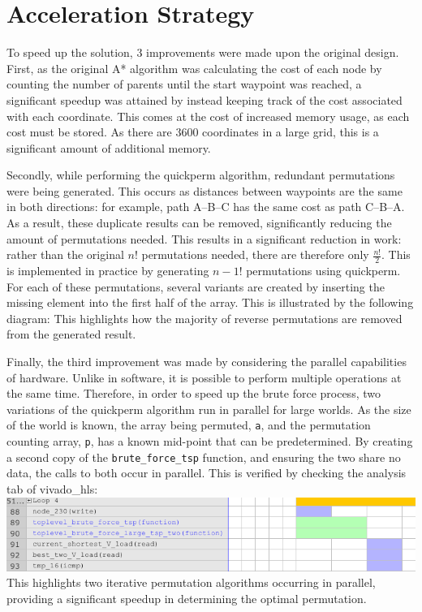 \documentclass[a4paper, 11pt]{article}
\begin{document}
\section{Acceleration Strategy} %
To speed up the solution, 3 improvements were made upon the original design. 
First, as the original A* algorithm was calculating the cost of each node by 
counting the number of parents until the start waypoint was reached, a significant 
speedup was attained by instead keeping track of the cost associated with each 
coordinate. This comes at the cost of increased memory usage, as each cost must 
be stored. As there are 3600 coordinates in a large grid, this is a significant 
amount of additional memory. 
\par\bigskip\noindent
Secondly, while performing the quickperm algorithm, redundant permutations were being 
generated. This occurs as distances between waypoints are the same in both directions: 
for example, path A--B--C has the same cost as path C--B--A. As a result, these 
duplicate results can be removed, significantly reducing the amount of permutations 
needed. This results in a significant reduction in work: rather than the original 
$n!$ permutations needed, there are therefore only
$\frac{n!}{2}$. 
This is implemented in practice by generating $n-1!$ permutations using
quickperm. For each of these permutations, several variants are created by 
inserting the missing element into the first half of the array. 
This is illustrated by the following diagram: 
This highlights how the majority of reverse permutations are removed from the
generated result. 
\par\bigskip\noindent
Finally, the third improvement was made by considering the parallel capabilities 
of hardware. Unlike in software, it is possible to perform multiple operations at 
the same time. Therefore, in order to speed up the brute force process, 
two variations of the quickperm algorithm run in parallel for large worlds. 
As the size of the world is known, the array being 
permuted, \texttt{a}, and the permutation counting array, \texttt{p}, has a known 
mid-point that can be predetermined. By creating a second copy of the 
\texttt{brute\_force\_tsp} function, and ensuring the two share no data, the calls 
to both occur in parallel. This is verified by checking the analysis tab of 
vivado\_hls:  \\
\includegraphics[width=\textwidth]{vivado_hls}
This highlights two iterative permutation algorithms occurring in parallel, providing 
a significant speedup in determining the optimal permutation. 
\end{document}
